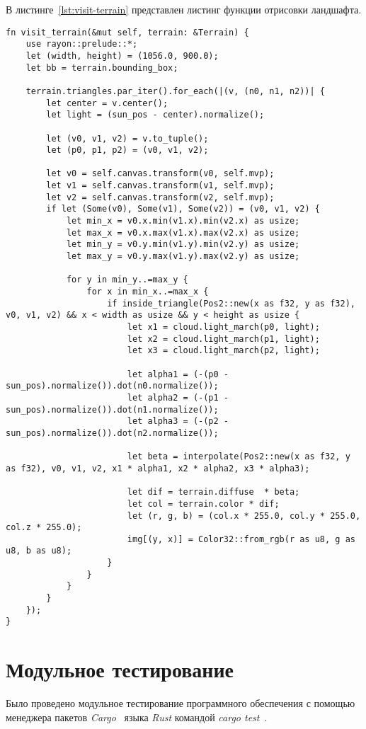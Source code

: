 В листинге~\ref{lst:visit-terrain}  представлен листинг функции отрисовки ландшафта.
\begin{lstlisting}[style=rust, caption={Функция отрисовки ландшафта},label={lst:visit-terrain}]
fn visit_terrain(&mut self, terrain: &Terrain) {
	use rayon::prelude::*;
	let (width, height) = (1056.0, 900.0);
	let bb = terrain.bounding_box;
	
	terrain.triangles.par_iter().for_each(|(v, (n0, n1, n2))| {
		let center = v.center();
		let light = (sun_pos - center).normalize();
		
		let (v0, v1, v2) = v.to_tuple();
		let (p0, p1, p2) = (v0, v1, v2);
		
		let v0 = self.canvas.transform(v0, self.mvp);
		let v1 = self.canvas.transform(v1, self.mvp);
		let v2 = self.canvas.transform(v2, self.mvp);
		if let (Some(v0), Some(v1), Some(v2)) = (v0, v1, v2) {
			let min_x = v0.x.min(v1.x).min(v2.x) as usize;
			let max_x = v0.x.max(v1.x).max(v2.x) as usize;
			let min_y = v0.y.min(v1.y).min(v2.y) as usize;
			let max_y = v0.y.max(v1.y).max(v2.y) as usize;
			
			for y in min_y..=max_y {
				for x in min_x..=max_x {
					if inside_triangle(Pos2::new(x as f32, y as f32), v0, v1, v2) && x < width as usize && y < height as usize {	
						let x1 = cloud.light_march(p0, light);
						let x2 = cloud.light_march(p1, light);
						let x3 = cloud.light_march(p2, light);
						
						let alpha1 = (-(p0 - sun_pos).normalize()).dot(n0.normalize());
						let alpha2 = (-(p1 - sun_pos).normalize()).dot(n1.normalize());
						let alpha3 = (-(p2 - sun_pos).normalize()).dot(n2.normalize());
						
						let beta = interpolate(Pos2::new(x as f32, y as f32), v0, v1, v2, x1 * alpha1, x2 * alpha2, x3 * alpha3);
						
						let dif = terrain.diffuse  * beta;
						let col = terrain.color * dif;
						let (r, g, b) = (col.x * 255.0, col.y * 255.0, col.z * 255.0);
						img[(y, x)] = Color32::from_rgb(r as u8, g as u8, b as u8);
					}
				}
			}
		}
	});
}
\end{lstlisting}
\newpage
\section{Модульное тестирование}
Было проведено модульное тестирование программного обеспечения с помощью менеджера пакетов \textit{Cargo}~\cite{rust_cargo} языка \textit{Rust} командой \textit{cargo test}~\cite{rust_cargo_test}.

